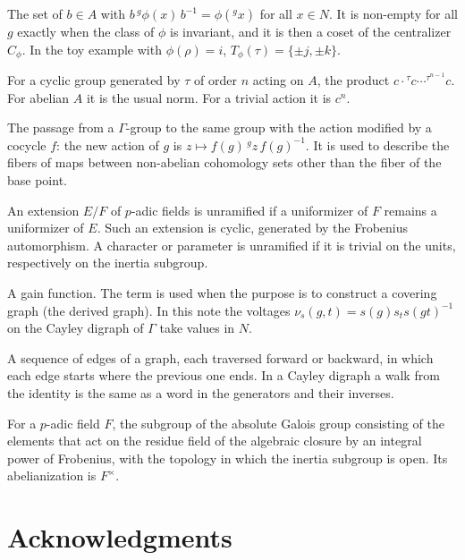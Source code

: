 \documentclass[12pt,letterpaper]{article}
\numberwithin{equation}{section}
\theoremstyle{plain}
\theoremstyle{definition}
\newcommand{\act}[2]{{}^{#1}\!#2}          %
\begin{document}
\begin{description}[itemsep=3pt,leftmargin=1.5em,style=unboxed]
\item[Transporter $T_\phi(g)$.] The set of $b\in A$ with
$b\,\act{g}{\phi(x)}\,b^{-1}=\phi(\act{g}{x})$ for all $x\in N$. It is
non-empty for all $g$ exactly when the class of $\phi$ is invariant, and
it is then a coset of the centralizer $C_\phi$. In the toy example with
$\phi(\rho)=i$, $T_\phi(\tau)=\{\pm j,\pm k\}$.

\item[Twisted norm.] For a cyclic group generated by $\tau$ of order $n$
acting on $A$, the product
$c\cdot\act{\tau}{c}\cdots\act{\tau^{n-1}}{c}$. For abelian $A$ it is the
usual norm. For a trivial action it is $c^n$.

\item[Twisting.] The passage from a $\Gamma$-group to the same group with
the action modified by a cocycle $f$: the new action of $g$ is
$z\mapsto f(g)\,\act{g}{z}\,f(g)^{-1}$. It is used to describe the fibers
of maps between non-abelian cohomology sets other than the fiber of the
base point.

\item[Unramified.] An extension $E/F$ of $p$-adic fields is unramified if
a uniformizer of $F$ remains a uniformizer of $E$. Such an extension is
cyclic, generated by the Frobenius automorphism. A character or parameter
is unramified if it is trivial on the units, respectively on the inertia
subgroup.

\item[Voltage assignment.] A gain function. The term is used when the
purpose is to construct a covering graph (the derived graph). In this
note the voltages $\nu_s(g,t)=s(g)s_ts(gt)^{-1}$ on the Cayley digraph of
$\Gamma$ take values in $N$.

\item[Walk.] A sequence of edges of a graph, each traversed forward or
backward, in which each edge starts where the previous one ends. In a
Cayley digraph a walk from the identity is the same as a word in the
generators and their inverses.

\item[Weil group $W_F$.] For a $p$-adic field $F$, the subgroup of the
absolute Galois group consisting of the elements that act on the residue
field of the algebraic closure by an integral power of Frobenius, with the
topology in which the inertia subgroup is open. Its abelianization is
$F^\times$.
\end{description}

\section*{Acknowledgments}
\end{document}
